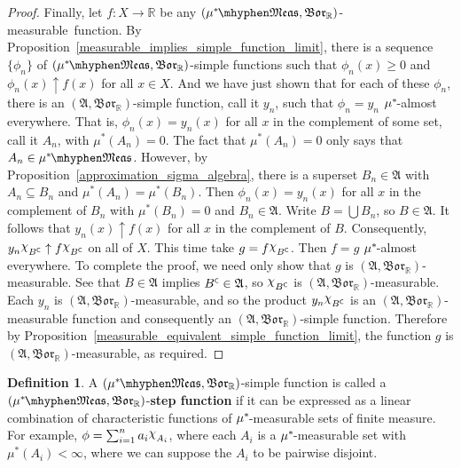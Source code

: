 \documentclass[
twoside=true,
paper=letter,
fontsize=9pt,
pagesize=auto,
leqno,
openany,
headsepline,
overfullrule,
]{scrbook}
\theoremstyle{plain}
\theoremstyle{plain}
\theoremstyle{definition}
\newtheorem{defn}[thm]{Definition}
\theoremstyle{bfnoteitalic}
\theoremstyle{bfnoteroman}
\newcommand{\term}[1]{\textbf{#1}\index{#1}}
\newcommand{\sigalg}[1]{\mathfrak{#1}}
\newcommand{\borel}{\mathfrak{Bor}}
\newcommand{\charfunction}[1]{{\raisebox{2pt}{$\chi$}}_{#1}}
\newcommand{\comp}{^{\hbox{\tiny{$\mathsf C$}}}}
\newcommand{\R}{\mathbb{R}}
\newcommand{\sigmaalgebra}{\sigalg{A}}
\newcommand{\measurable}[1]{{#1}\mhyphen\mathfrak{Meas}}
\newcommand{\kernast}{\ast\kern-1pt}
\newcommand{\mbmeasurable}{$(\measurable{\measure^\kernast},\borel_\R)$\hyp{}measurable}
\newcommand{\measurespace}{X}
\newcommand{\mspaceeltii}{y}
\newcommand{\measure}{\mu}
\begin{document}
\begin{proof}
Finally, let $f:\measurespace\to\R$ be any \mbmeasurable\ function.
By Proposition~\ref{measurable_implies_simple_function_limit}, there is a sequence $\{ \phi_n \}$ of $(\measurable{\measure^\kernast},\borel_\R)$-simple functions such that $\phi_n(x)\geq 0$ and $\phi_n(x)\uparrow f(x)$ for all $x\in\measurespace$.
And we have just shown that for each of these $\phi_n$, there is an $(\sigmaalgebra,\borel_\R)$-simple function, call it $\mspaceeltii_n$, such that $\phi_n = \mspaceeltii_n$  $\measure^\kernast$-almost everywhere. That is, $\phi_n(x) = \mspaceeltii_n(x)$ for all $x$ in the complement of some set, call it $A_n$, with $\measure^*(A_n) = 0$. 
The fact that $\measure^*(A_n)=0$ only says that $A_n\in\measurable{\measure^\kernast}$.
However, by Proposition~\ref{approximation_sigma_algebra}, there is a superset $B_n\in \sigmaalgebra$ with $A_n\subseteq B_n$ and $\measure^*(A_n) = \measure^*(B_n)$.
Then $\phi_n(x) = \mspaceeltii_n(x)$ for all $x$ in the complement of $B_n$ with $\measure^*(B_n) = 0$ and $B_n\in\sigmaalgebra$. 
Write $B=\bigcup B_n$, so $B\in\sigmaalgebra$.  
It follows that $\mspaceeltii_n(x) \uparrow f(x)$ for all $x$ in the complement of $B$. Consequently, $\mspaceeltii_n \charfunction{B\comp} \uparrow f \charfunction{B\comp}$ on all of $\measurespace$. This time take $g=f \charfunction{B\comp}$. Then $f = g$ $\measure^\kernast$-almost everywhere. To complete the proof, we need only show that $g$ is $(\sigmaalgebra,\borel_\R)$\hyp{}measurable. See that $B\in\sigmaalgebra$ implies $B\comp\in\sigmaalgebra$, so $\charfunction{B\comp}$ is $(\sigmaalgebra,\borel_\R)$\hyp{}measurable. Each $\mspaceeltii_n$ is $(\sigmaalgebra,\borel_\R)$\hyp{}measurable, and so the product $\mspaceeltii_n \charfunction{B\comp}$ is an $(\sigmaalgebra,\borel_\R)$\hyp{}measurable function and consequently an $(\sigmaalgebra,\borel_\R)$-simple function. Therefore by Proposition~\ref{measurable_equivalent_simple_function_limit}, the function $g$ is $(\sigmaalgebra,\borel_\R)$\hyp{}measurable, as required.
\end{proof}



\begin{defn}\label{step_function}
A $(\measurable{\measure^\kernast}, \borel_\R)$\hyp{}simple function is called a 
$(\measurable{\measure^\kernast},\borel_\R)$\hyp{}\term{step function} if it can be expressed as a linear combination of characteristic functions of $\measure^\kernast$\hyp{}measurable sets of finite measure.  For example, $\phi=\sum_{i=1}^n a_i\charfunction{A_i}$, where each $A_i$ is a $\measure^\kernast$-measurable set with $\measure^*(A_i) < \infty$, where we can suppose the $A_i$ to be pairwise disjoint.
\end{defn}
\end{document}
